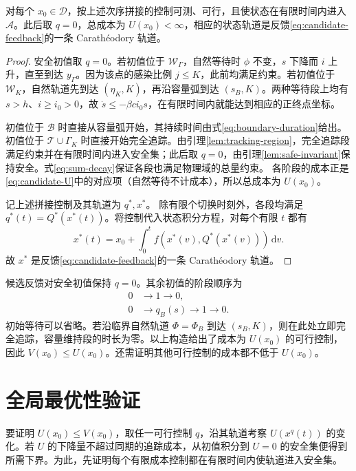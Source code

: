 \documentclass[lang=cn,a4paper,newtx]{elegantpaper}
\theoremstyle{plain}
\theoremstyle{definition}
\newcommand{\Acal}{\mathcal A}
\newcommand{\Dcal}{\mathcal D}
\newcommand{\dd}{\,\mathrm d}
\begin{document}
\begin{proposition}[候选策略的可行性与总成本]
\label{prop:candidate-attainment}
对每个 $x_0\in\Dcal$，按上述次序拼接的控制可测、可行，且使状态在有限时间内进入 $\Acal$。此后取 $q=0$，总成本为 $U(x_0)<\infty$，相应的状态轨道是反馈\eqref{eq:candidate-feedback}的一条 Carath\'eodory 轨道。
\end{proposition}
\begin{proof}
安全初值取 $q=0$。若初值位于 $\mathcal W_\Gamma$，自然等待时 $\phi$ 不变，$s$ 下降而 $i$ 上升，直至到达 $y_\Gamma$。因为该点的感染比例 $j\le K$，此前均满足约束。若初值位于 $\mathcal W_K$，自然轨道先到达 $(\eta_K,K)$，再沿容量弧到达 $(s_B,K)$。两种等待段上均有 $s>h$、$i\ge i_0>0$，故 $\dot s\le-\beta ci_0s$，在有限时间内就能达到相应的正终点坐标。

初值位于 $\mathcal B$ 时直接从容量弧开始，其持续时间由式\eqref{eq:boundary-duration}给出。初值位于 $\mathcal T\cup\Gamma_K$ 时直接开始完全追踪。由引理\ref{lem:tracking-region}，完全追踪段满足约束并在有限时间内进入安全集；此后取 $q=0$，由引理\ref{lem:safe-invariant}保持安全。式\eqref{eq:sum-decay}保证各段也满足物理域的总量约束。
各阶段的成本正是\eqref{eq:candidate-U}中的对应项（自然等待不计成本），所以总成本为 $U(x_0)$。

记上述拼接控制及其轨道为 $q^*,x^*$。
除有限个切换时刻外，各段均满足 $q^*(t)=Q^*(x^*(t))$。将控制代入状态积分方程，对每个有限 $t$ 都有
\[
x^*(t)=x_0+\int_0^t f(x^*(v),Q^*(x^*(v)))\dd v.
\]
故 $x^*$ 是反馈\eqref{eq:candidate-feedback}的一条 Carath\'eodory 轨道。
\end{proof}

候选反馈对安全初值保持 $q=0$。其余初值的阶段顺序为
\begin{align}
0&\longrightarrow1\longrightarrow0,
\label{eq:direct-structure}\\
0&\longrightarrow q_B(s)\longrightarrow1\longrightarrow0.
\label{eq:capacity-structure}
\end{align}
初始等待可以省略。若沿临界自然轨道 $\Phi=\Phi_B$ 到达 $(s_B,K)$，则在此处立即完全追踪，容量维持段的时长为零。以上构造给出了成本为 $U(x_0)$ 的可行控制，因此 $V(x_0)\le U(x_0)$。还需证明其他可行控制的成本都不低于 $U(x_0)$。

\section{全局最优性验证}
\label{sec:optimality}

要证明 $U(x_0)\le V(x_0)$，取任一可行控制 $q$，沿其轨道考察 $U(x^q(t))$ 的变化。若 $U$ 的下降量不超过同期的追踪成本，从初值积分到 $U=0$ 的安全集便得到所需下界。为此，先证明每个有限成本控制都在有限时间内使轨道进入安全集。
\end{document}
